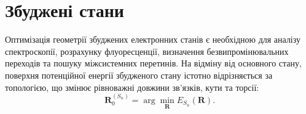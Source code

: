 %
%
%
%
%
%
%
%

\section{Збуджені стани}

Оптимізація геометрії збуджених електронних станів є необхідною для
аналізу спектроскопії, розрахунку флуоресценції, визначення безвипромінювальних переходів та пошуку міжсистемних перетинів.
На відміну від основного стану, поверхня потенційної енергії збудженого
стану істотно відрізняється за топологією, що змінює рівноважні довжини
зв'язків, кути та торсії:
\[
\mathbf R^{(S_n)}_0 = \arg\min_{\mathbf R} E_{S_n}(\mathbf R).
\]

